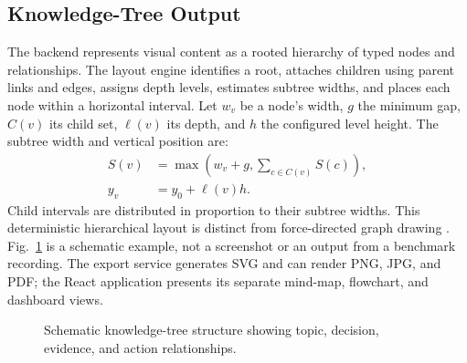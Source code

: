\documentclass[conference]{IEEEtran}
\begin{document}
\subsection{Knowledge-Tree Output}
The backend represents visual content as a rooted hierarchy of typed nodes and relationships. The layout engine identifies a root, attaches children using parent links and edges, assigns depth levels, estimates subtree widths, and places each node within a horizontal interval. Let $w_v$ be a node's width, $g$ the minimum gap, $C(v)$ its child set, $\ell(v)$ its depth, and $h$ the configured level height. The subtree width and vertical position are:
\begin{equation}
\begin{aligned}
S(v)&=\max\left(w_v+g,\sum_{c\in C(v)}S(c)\right),\\
y_v&=y_0+\ell(v)h.
\end{aligned}
\end{equation}
Child intervals are distributed in proportion to their subtree widths. This deterministic hierarchical layout is distinct from force-directed graph drawing \cite{graphdrawing,fruchterman}. Fig.~\ref{fig:tree} is a schematic example, not a screenshot or an output from a benchmark recording. The export service generates SVG and can render PNG, JPG, and PDF; the React application presents its separate mind-map, flowchart, and dashboard views.

\begin{figure}[t]
\centering
{}
\caption{Schematic knowledge-tree structure showing topic, decision, evidence, and action relationships.}
\label{fig:tree}
\end{figure}
\end{document}
